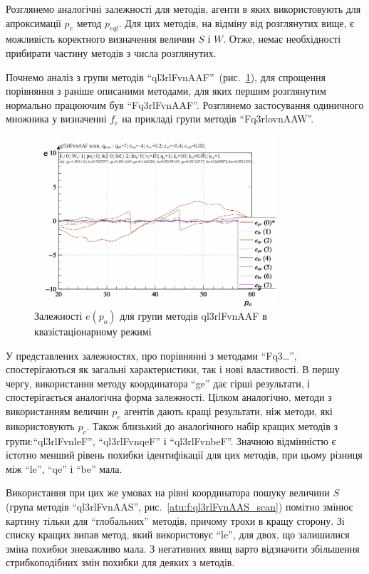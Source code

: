 Розглянемо аналогічні залежності для методів, агенти в яких
використовують для апроксимації
$ p_e $ метод
$ p_{eql} $. Для цих методів, на відміну від розглянутих вище, є
можливість коректного визначення величин
$S$ і
$W$. Отже, немає необхідності прибирати частину методів з числа
розглянутих.

Почнемо аналіз з групи методів ``ql3rlFvnAAF''~(рис.~\ref{atu:f:ql3rlFvnAAF_scan}),
для спрощення порівняння з раніше описаними методами, для яких
першим розглянутим нормально працюючим був ``Fq3rlFvnAAF''. Розглянемо
застосування одиничного множника у визначенні
$ f_e $ на прикладі групи методів ``Fq3rlovnAAW''.

\begin{figure}[htb!]
  \begin{center}
    \includegraphics[width=0.8\textwidth]{p/scan/qls-p_p_e_ql3rlFvnAAF_scan.png}
  \end{center}
  \caption{Залежності $e(p_o)$ для групи методів ql3rlFvnAAF в квазістаціонарному режимі}
  \label{atu:f:ql3rlFvnAAF_scan}
\end{figure}

У представлених залежностях, про порівнянні з методами ``Fq3\ldots'',
спостерігаються як загальні характеристики, так і нові
властивості. В першу чергу, використання методу координатора
``ge'' дає гірші результати, і спостерігається аналогічна форма
залежності. Цілком аналогічно, методи з використанням величин
$ p_e $ агентів дають кращі результати, ніж методи, які
використовують
$ p_c $. Також близький до аналогічного набір кращих методів з
групи:``ql3rlFvnleF'', ``ql3rlFvnqeF'' і ``ql3rlFvnbeF''. Значною відмінністю є
істотно менший рівень похибки ідентифікації для цих методів,
при цьому різниця між ``le'', ``qe'' і ``be'' мала.


Використання при цих же умовах на рівні координатора пошуку
величини
$S$ (група методів ``ql3rlFvnAAS'', рис.~\ref{atu:f:ql3rlFvnAAS_scan}) помітно змінює
картину тільки для ``глобальних'' методів, причому трохи  в
кращу сторону. Зі списку кращих випав метод, який використовує
``le'', для двох, що залишилися зміна похибки зневажливо мала. З
негативних явищ варто відзначити збільшення стрибкоподібних
змін похибки для деяких з методів.


